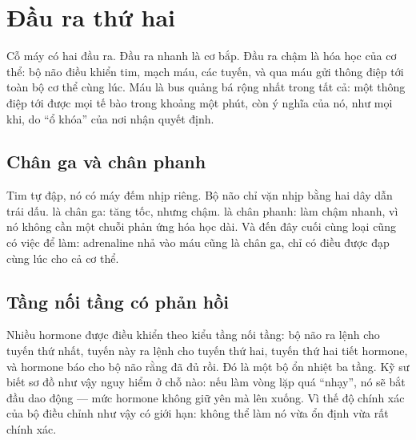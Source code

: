 \chapter{Đầu ra thứ hai}

Cỗ máy có hai đầu ra. Đầu ra nhanh là cơ bắp. Đầu ra chậm là hóa học của cơ thể: bộ não điều khiển tim, mạch máu, các tuyến, và qua máu gửi thông điệp tới toàn bộ cơ thể cùng lúc. Máu là bus quảng bá rộng nhất trong tất cả: một thông điệp tới được mọi tế bào trong khoảng một phút, còn ý nghĩa của nó, như mọi khi, do ``ổ khóa'' của nơi nhận quyết định.

\section*{Chân ga và chân phanh}

Tim tự đập, nó có máy đếm nhịp riêng. Bộ não chỉ vặn nhịp bằng hai dây dẫn trái dấu.  là chân ga: tăng tốc, nhưng chậm.  là chân phanh: làm chậm nhanh, vì nó không cần một chuỗi phản ứng hóa học dài. Và đến đây cuối cùng loại  cũng có việc để làm: adrenaline nhả vào máu cũng là chân ga, chỉ có điều được đạp cùng lúc cho cả cơ thể.


\section*{Tầng nối tầng có phản hồi}

Nhiều hormone được điều khiển theo kiểu tầng nối tầng: bộ não ra lệnh cho tuyến thứ nhất, tuyến này ra lệnh cho tuyến thứ hai, tuyến thứ hai tiết hormone, và hormone báo cho bộ não rằng đã đủ rồi. Đó là một bộ ổn nhiệt ba tầng. Kỹ sư biết sơ đồ như vậy nguy hiểm ở chỗ nào: nếu làm vòng lặp quá ``nhạy'', nó sẽ bắt đầu dao động --- mức hormone không giữ yên mà lên xuống. Vì thế độ chính xác của bộ điều chỉnh như vậy có giới hạn: không thể làm nó vừa ổn định vừa rất chính xác.

